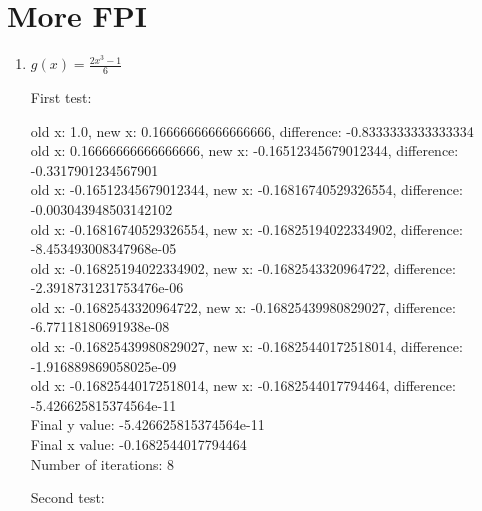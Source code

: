 \documentclass[12pt]{article}
\begin{document}
\section{More FPI}
\begin{enumerate}
\item $g(x)= \frac{2x^3-1}{6}$

First test:
\begin{footnotesize}
\begin{spacing}{-.8}
old x: 1.0, new x: 0.16666666666666666, difference: -0.8333333333333334\\
old x: 0.16666666666666666, new x: -0.16512345679012344, difference: -0.3317901234567901\\
old x: -0.16512345679012344, new x: -0.16816740529326554, difference: -0.003043948503142102\\
old x: -0.16816740529326554, new x: -0.16825194022334902, difference: -8.453493008347968e-05\\
old x: -0.16825194022334902, new x: -0.1682543320964722, difference: -2.3918731231753476e-06\\
old x: -0.1682543320964722, new x: -0.16825439980829027, difference: -6.77118180691938e-08\\
old x: -0.16825439980829027, new x: -0.16825440172518014, difference: -1.916889869058025e-09\\
old x: -0.16825440172518014, new x: -0.1682544017794464, difference: -5.426625815374564e-11\\
Final y value: -5.426625815374564e-11\\
Final x value: -0.1682544017794464\\
Number of iterations: 8\\
\end{spacing}
\end{footnotesize}

\vspace{.25in}
Second test:
\vspace{.05in}


\end{enumerate}
\end{document}
